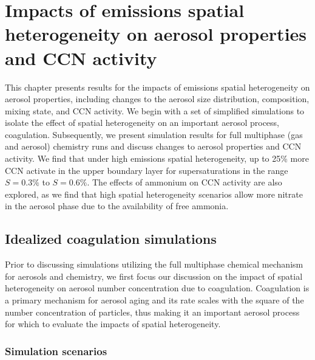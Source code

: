 \chapter{Impacts of emissions spatial heterogeneity on aerosol properties and CCN activity}

This chapter presents results for the impacts of emissions spatial heterogeneity on aerosol properties, including changes to the aerosol size distribution, composition, mixing state, and CCN activity. We begin with a set of simplified simulations to isolate the effect of spatial heterogeneity on an important aerosol process, coagulation. Subsequently, we present simulation results for full multiphase (gas and aerosol) chemistry runs and discuss changes to aerosol properties and CCN activity. We find that under high emissions spatial heterogeneity, up to 25\% more CCN activate in the upper boundary layer for supersaturations in the range $S=0.3\%$ to $S=0.6\%$. The effects of ammonium on CCN activity are also explored, as we find that high spatial heterogeneity scenarios allow more nitrate in the aerosol phase due to the availability of free ammonia.
\section{Idealized coagulation simulations}

Prior to discussing simulations utilizing the full multiphase chemical mechanism for aerosols and chemistry, we first focus our discussion on the impact of spatial heterogeneity on aerosol number concentration due to coagulation. Coagulation is a primary mechanism for aerosol aging and its rate scales with the square of the number concentration of particles, thus making it an important aerosol process for which to evaluate the impacts of spatial heterogeneity. 

\subsection{Simulation scenarios}

